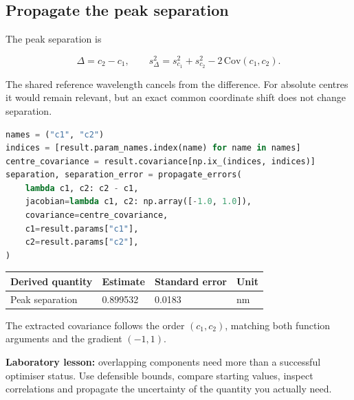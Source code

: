 \documentclass[
  british,
  10pt,
  a4paper,
]{article}
\begin{document}

\subsection{Propagate the peak
separation}\label{propagate-the-peak-separation}

The peak separation is

\begin{equation}\Delta=c_2-c_1,\qquad
s_\Delta^2=s_{c_1}^2+s_{c_2}^2-2\,\mathrm{Cov}(c_1,c_2).\end{equation}

The shared reference wavelength cancels from the difference. For
absolute centres it would remain relevant, but an exact common
coordinate shift does not change separation.

\par\noindent\begin{minipage}{\linewidth}

\begin{lstlisting}[language=Python]
names = ("c1", "c2")
indices = [result.param_names.index(name) for name in names]
centre_covariance = result.covariance[np.ix_(indices, indices)]
separation, separation_error = propagate_errors(
    lambda c1, c2: c2 - c1,
    jacobian=lambda c1, c2: np.array([-1.0, 1.0]),
    covariance=centre_covariance,
    c1=result.params["c1"],
    c2=result.params["c2"],
)
\end{lstlisting}

\end{minipage}\par

\begin{longtable}[]{@{}llll@{}}
\toprule\noalign{}
Derived quantity & Estimate & Standard error & Unit \\
\midrule\noalign{}
\endhead
\bottomrule\noalign{}
\endlastfoot
Peak separation & 0.899532 & 0.0183 & nm \\
\end{longtable}

The extracted covariance follows the order \((c_1,c_2)\), matching both
function arguments and the gradient \((-1,1)\).

\textbf{Laboratory lesson:} overlapping components need more than a
successful optimiser status. Use defensible bounds, compare starting
values, inspect correlations and propagate the uncertainty of the
quantity you actually need.

\clearpage
\end{document}

